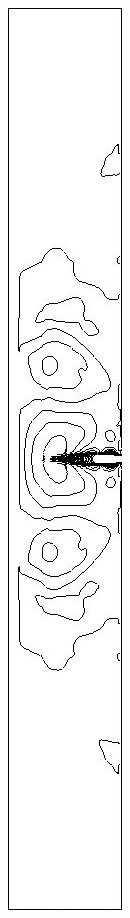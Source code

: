 \begin{figure}[h]
\centering
\begin{subfigure}[b]{0.15\textwidth}
\centering
\includegraphics[width=\textwidth]{png/cranium/2d-sxx-01.png}

\end{subfigure}
\end{figure}

